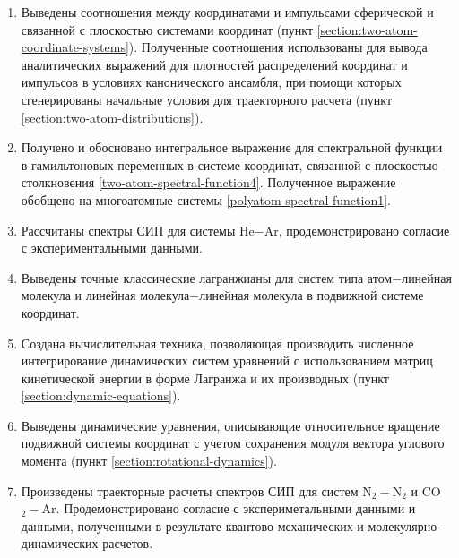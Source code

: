 \begin{enumerate}
    \item Выведены соотношения между координатами и импульсами сферической и связанной с плоскостью системами координат (пункт \ref{section:two-atom-coordinate-systems}). Полученные соотношения использованы для вывода  аналитических выражений для плотностей распределений координат и импульсов в условиях канонического ансамбля, при помощи которых сгенерированы начальные условия для траекторного расчета (пункт \ref{section:two-atom-distributions}).
    \item Получено и обосновано интегральное выражение для спектральной функции в гамильтоновых переменных в системе координат, связанной с плоскостью столкновения \eqref{two-atom-spectral-function4}. Полученное выражение обобщено на многоатомные системы \eqref{polyatom-spectral-function1}. 
    \item Рассчитаны спектры СИП для системы He$-$Ar, продемонстрировано согласие с экспериментальными данными. 
    \item Выведены точные классические лагранжианы для систем типа атом$-$линейная молекула и линейная молекула$-$линейная молекула в подвижной системе координат.
    \item Создана вычислительная техника, позволяющая производить численное интегрирование динамических систем уравнений с использованием матриц кинетической энергии в форме Лагранжа и их производных (пункт \ref{section:dynamic-equations}).
    \item Выведены динамические уравнения, описывающие относительное вращение подвижной системы координат с учетом сохранения модуля вектора углового момента (пункт \ref{section:rotational-dynamics}).
    \item Произведены траекторные расчеты спектров СИП для систем N$_2-$N$_2$ и CO$_2-$Ar. Продемонстрировано согласие с экспериметальными данными и данными, полученными в результате квантово-механических и молекулярно-динамических расчетов.
\end{enumerate}

\iffalse
Из проделанной работы были сделаны следующие выводы
\begin{enumerate}
    \item Построена методика расчета столкновительно-индуцированных спектров методом классических траекторий. При помощи развитой методики проведены расчеты спектров систем He$-$Ar, CO$_2-$Ar и N$_2-$N$_2$, которые находятся в хорошем согласии с экспериментальными и теоретическими данными.
\end{enumerate}
\fi
